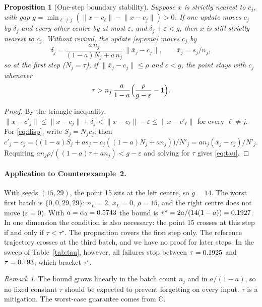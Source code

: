 \documentclass[11pt]{article}
\newtheorem{proposition}{Proposition}
\theoremstyle{remark}
\newtheorem{remark}{Remark}
\newcommand{\norm}[1]{\lVert #1\rVert}
\begin{document}
\begin{proposition}[One-step boundary stability]\label{prop:step}
Suppose $x$ is strictly nearest to $c_j$, with gap $g=\min_{\ell\ne j}(\norm{x-c_\ell}-\norm{x-c_j})>0$.
If one update moves $c_j$ by $\delta_j$ and every other centre by at most $\varepsilon$, and
$\delta_j+\varepsilon<g$, then $x$ is still strictly nearest to $c_j$. Without revival, the update
\eqref{eq:ema} moves $c_j$ by
\begin{equation}\label{eq:disp}
\delta_j=\frac{a\,n_j}{(1-a)N_j+a\,n_j}\,\norm{\bar x_j-c_j},\qquad \bar x_j=s_j/n_j,
\end{equation}
so at the first step ($N_j=\tau$), if $\norm{\bar x_j-c_j}\le\rho$ and $\varepsilon<g$, the point stays
with $c_j$ whenever
\begin{equation}\label{eq:tau}
\tau>n_j\,\frac{a}{1-a}\Bigl(\frac{\rho}{g-\varepsilon}-1\Bigr).
\end{equation}
\end{proposition}
\begin{proof}
By the triangle inequality, $\norm{x-c'_j}\le\norm{x-c_j}+\delta_j<\norm{x-c_\ell}-\varepsilon\le\norm{x-c'_\ell}$
for every $\ell\ne j$. For \eqref{eq:disp}, write $S_j=N_jc_j$; then
$c'_j-c_j=\bigl((1-a)S_j+as_j-c_j((1-a)N_j+an_j)\bigr)/N'_j=an_j(\bar x_j-c_j)/N'_j$.
Requiring $a n_j\rho/((1-a)\tau+an_j)<g-\varepsilon$ and solving for $\tau$ gives \eqref{eq:tau}.
\end{proof}

\paragraph{Application to Counterexample~2.} With seeds $(15,29)$, the point 15 sits at the left
centre, so $g=14$. The worst first batch is $\{0,0,29,29\}$: $n_L=2$, $\bar x_L=0$, $\rho=15$, and the
right centre does not move ($\varepsilon=0$). With $a=\alpha_0=0.5743$ the bound is
$\tau^\star=2a/(14(1-a))=0.1927$. In one dimension the condition is also necessary: the point 15
crosses at this step if and only if $\tau<\tau^\star$. The proposition covers the first step only.
The reference trajectory crosses at the third batch, and we have no proof for later steps. In the sweep of Table~\ref{tab:tau}, however, all failures stop between $\tau=0.1925$ and
$\tau=0.193$, which bracket $\tau^\star$.

\begin{remark}\label{rem:notau}
The bound grows linearly in the batch count $n_j$ and in $a/(1-a)$, so no fixed constant $\tau$
should be expected to prevent forgetting on every input. $\tau$ is a mitigation. The worst-case
guarantee comes from C.
\end{remark}
\end{document}
